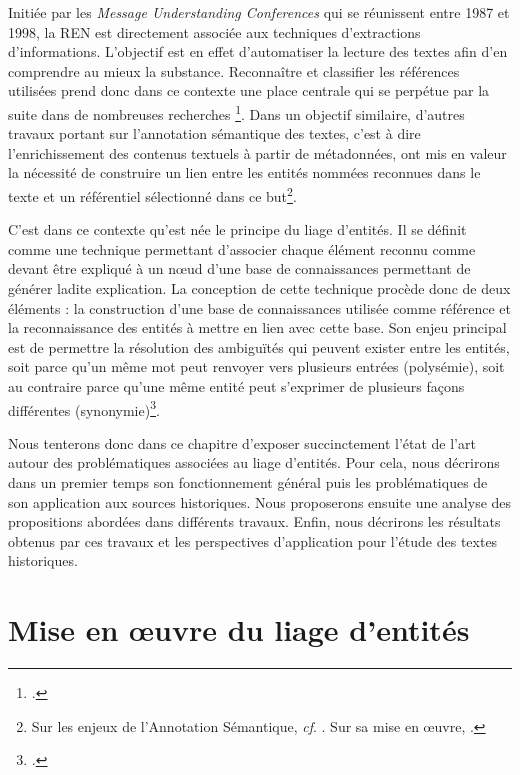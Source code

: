 \documentclass[a4paper,12pt,twoside]{book}
\begin{document}
	Initiée par les \textit{Message Understanding Conferences} qui se réunissent entre 1987 et 1998, la REN est directement associée aux techniques d'extractions d'informations. L'objectif est en effet d'automatiser la lecture des textes afin d'en comprendre au mieux la substance. Reconnaître et classifier les références utilisées prend donc dans ce contexte une place centrale qui se perpétue par la suite dans de nombreuses recherches \footcite[p. 17--19]{ehrmann_les_2008}. Dans un objectif similaire, d'autres travaux portant sur l'annotation sémantique des textes, c'est à dire l'enrichissement des contenus textuels à partir de métadonnées, ont mis en valeur la nécessité de construire un lien entre les entités nommées reconnues dans le texte et un référentiel sélectionné dans ce but\footnote{Sur les enjeux de l'Annotation Sémantique, \textit{cf}. \cite[p. 15--16]{stern_identification_2013}. Sur sa mise en œuvre, \cite[p. 96--99]{stern_identification_2013}.}.
	
	C'est dans ce contexte qu'est née le principe du liage d'entités. Il se définit comme une technique permettant d'associer chaque élément reconnu comme devant être expliqué à un nœud d'une base de connaissances permettant de générer ladite explication. La conception de cette technique procède donc de deux éléments : la construction d'une base de connaissances utilisée comme référence et la reconnaissance des entités à mettre en lien avec cette base. Son enjeu principal est de permettre la résolution des ambiguïtés qui peuvent exister entre les entités, soit parce qu'un même mot peut renvoyer vers plusieurs entrées (polysémie), soit au contraire parce qu'une même entité peut s'exprimer de plusieurs façons différentes (synonymie)\footcite[p. 110--114]{stern_identification_2013}.
	
	Nous tenterons donc dans ce chapitre d'exposer succinctement l'état de l'art autour des  problématiques associées au liage d'entités. Pour cela, nous décrirons dans un premier temps son fonctionnement général puis les problématiques de son application aux sources historiques. Nous proposerons ensuite une analyse des propositions abordées dans différents travaux. Enfin, nous décrirons les résultats obtenus par ces travaux et les perspectives d'application pour l'étude des textes historiques.
	
	
	\section{Mise en œuvre du liage d'entités}
	
\end{document}
